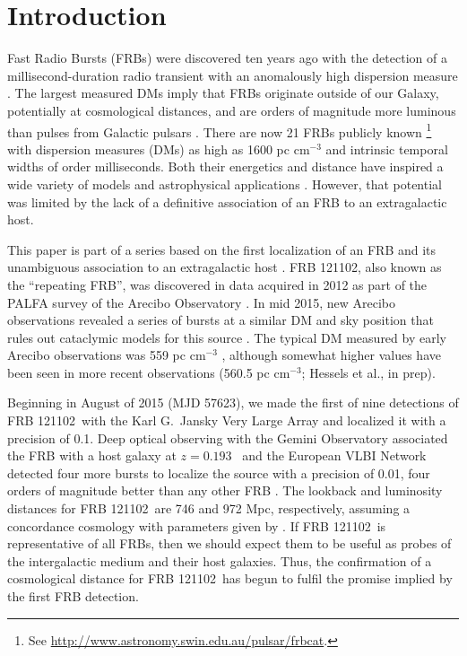 \documentclass[twocolumn]{aastex61}
\newcommand{\frb}{FRB 121102}
\begin{document}
\section{Introduction}

Fast Radio Bursts (FRBs) were discovered ten years ago with the detection of a millisecond-duration radio transient with an anomalously high dispersion measure \citep{2007Sci...318..777L}. The largest measured DMs imply that FRBs originate outside of our Galaxy, potentially at cosmological distances, and are orders of magnitude more luminous than pulses from Galactic pulsars \citep{2013Sci...341...53T}. There are now 21 FRBs publicly known \footnote{See \url{http://www.astronomy.swin.edu.au/pulsar/frbcat}.} with dispersion measures (DMs) as high as 1600 pc cm$^{-3}$ and intrinsic temporal widths of order milliseconds. Both their energetics and distance have inspired a wide variety of models and astrophysical applications \citep[e.g.,][]{2014ApJ...780L..33M, 2014ApJ...797...70K, 2015MNRAS.450L..71F, 2016MNRAS.458L..19C, 2016MNRAS.457..232C, 2016MNRAS.462L..16P}. However, that potential was limited by the lack of a definitive association of an FRB to an extragalactic host.

This paper is part of a series based on the first localization of an FRB and its unambiguous association to an extragalactic host \citep{LOC, OPT, EVN}. \frb, also known as the ``repeating FRB'', was discovered \citep{2014ApJ...790..101S} in data acquired in 2012 as part of the PALFA survey of the Arecibo Observatory \citep{2006ApJ...637..446C}. In mid 2015, new Arecibo observations revealed a series of bursts at a similar DM and sky position that rules out cataclymic models for this source \citep{2016Natur.531..202S}. The typical DM measured by early Arecibo observations was 559 pc cm$^{-3}$ \citep{2016arXiv160308880S}, although somewhat higher values have been seen in more recent observations (560.5 pc cm$^{-3}$; Hessels et al., in prep).

Beginning in August of 2015 (MJD 57623), we made the first of nine detections of \frb\ with the Karl G.\ Jansky Very Large Array \citep[VLA;][]{LOC} and localized it with a precision of 0.1\arcsec. Deep optical observing with the Gemini Observatory associated the FRB with a host galaxy at $z=0.193$\ \citep{OPT} and the European VLBI Network detected four more bursts to localize the source with a precision of 0.01\arcsec, four orders of magnitude better than any other FRB \citep[precision of $\sim40$\ pc in linear distance;][]{EVN}. The lookback and luminosity distances for \frb\ are 746 and 972 Mpc, respectively, assuming a concordance cosmology with parameters given by \citet{2016A&A...594A..13P}. If \frb\ is representative of all FRBs, then we should expect them to be useful as probes of the intergalactic medium and their host galaxies. Thus, the confirmation of a cosmological distance for \frb\ has begun to fulfil the promise implied by the first FRB detection.
\end{document}
